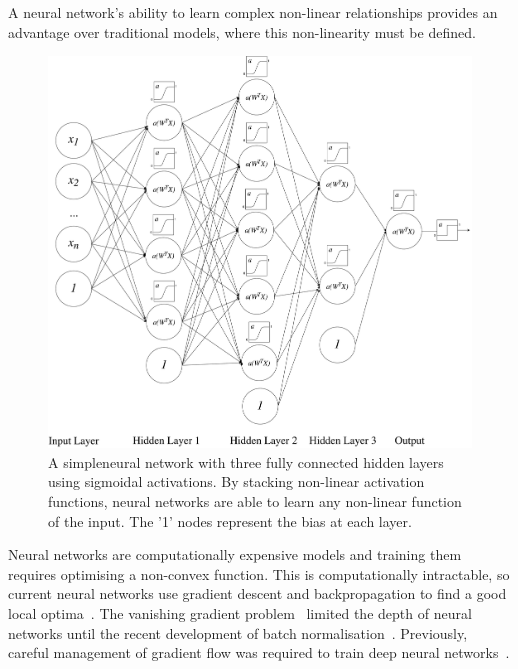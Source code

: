\documentclass[12pt, twoside]{book}
\begin{document}

\begin{highlight}
A neural network's ability to learn complex non-linear relationships provides an advantage over traditional models, where this non-linearity must be defined.
\end{highlight}

\begin{figure}[!htb]
\centering\includegraphics[width=1\linewidth]{neuralnet.pdf}
\caption{A simple\protect\footnotemark neural network with three fully connected hidden layers using sigmoidal activations. By stacking non-linear activation functions, neural networks are able to learn any non-linear function of the input. The '1' nodes represent the bias at each layer.}
\label{nnetstacked}
\end{figure}



Neural networks are computationally expensive models and training them requires optimising a non-convex function. This is computationally intractable, so current neural networks use gradient descent and backpropagation to find a good local optima~\cite{convexopt}. The vanishing gradient problem~\cite{vanishinggradient} limited the depth of neural networks until the recent development of batch normalisation~\cite{batchnorm}. Previously, careful management of gradient flow was required to train deep neural networks~\cite{googlenet}. 
\end{document}
